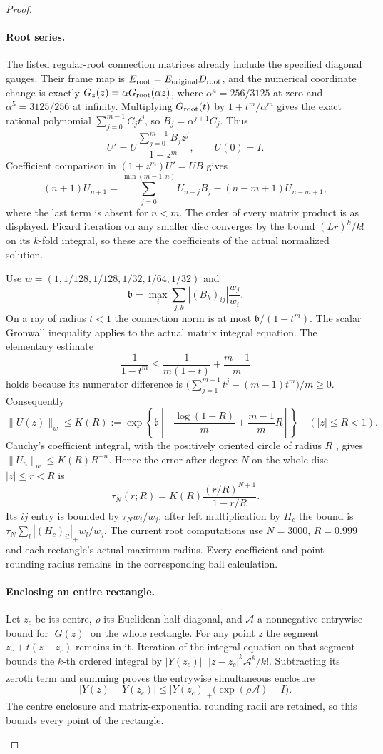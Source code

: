 \documentclass[11pt,a4paper]{article}
\theoremstyle{definition}
\begin{document}
\begin{proof}
\begin{enumerate}[label=\arabic*.]
\paragraph{Root series.}
The listed regular-root connection matrices already include the
specified diagonal gauges. Their frame map is
$E_{\rm root}=E_{\rm original}D_{\rm root}$, and the numerical
coordinate change is exactly
$G_z(z)=\alpha G_{\rm root}(\alpha z)$, where
$\alpha^4=256/3125$ at zero and $\alpha^5=3125/256$ at infinity.
Multiplying $G_{\rm root}(t)$ by $1+t^m/\alpha^m$ gives the exact
rational polynomial $\sum_{j=0}^{m-1}C_jt^j$, so
$B_j=\alpha^{j+1}C_j$. Thus
\[
 U'=U\frac{\sum_{j=0}^{m-1}B_jz^j}{1+z^m},\qquad U(0)=I.\tag{1.18.2}
\]
Coefficient comparison in $(1+z^m)U'=UB$ gives
\[
 (n+1)U_{n+1}
 =\sum_{j=0}^{\min(m-1,n)}U_{n-j}B_j
   -(n-m+1)U_{n-m+1},
\]
where the last term is absent for $n<m$. The order of every
matrix product is as displayed. Picard iteration on any smaller
disc converges by the bound $(Lr)^k/k!$ on its $k$-fold integral,
so these are the coefficients of the actual normalized solution.

Use $w=(1,1/128,1/128,1/32,1/64,1/32)$ and
\[
 \mathfrak b=\max_i\sum_{j,k}|(B_k)_{ij}|\frac{w_j}{w_i}.
\]
On a ray of radius $t<1$ the connection norm is at most
$\mathfrak b/(1-t^m)$. The scalar Gronwall inequality
\cite[Lemma~2.7, pp.~42--43]{TeschlODE2012} applies to the actual
matrix integral equation. The elementary estimate
\[
 \frac1{1-t^m}\le\frac1{m(1-t)}+\frac{m-1}{m}
\]
holds because its numerator difference is
$\bigl(\sum_{j=1}^{m-1}t^j-(m-1)t^m\bigr)/m\ge0$.
Consequently
\[
 \|U(z)\|_w\le K(R):=
 \exp\!\left\{\mathfrak b\left[-\frac{\log(1-R)}m
                 +\frac{m-1}{m}R\right]\right\}
 \quad (|z|\le R<1).
\]
Cauchy's coefficient integral, with the positively oriented circle
of radius $R$ \cite[\S1.9(iii), (1.9.30)--(1.9.31)]{DLMFCauchy2026},
gives $\|U_n\|_w\le K(R)R^{-n}$. Hence the error after degree $N$
on the whole disc $|z|\le r<R$ is
\[
 \tau_N(r;R)=K(R)\frac{(r/R)^{N+1}}{1-r/R}.\tag{1.18.3}
\]
Its $ij$ entry is bounded by $\tau_Nw_i/w_j$; after left
multiplication by $H_c$ the bound is
$\tau_N\sum_l|(H_c)_{il}|_+w_l/w_j$.
The current root computations use $N=3000$, $R=0.999$ and each
rectangle's actual maximum radius. Every coefficient and point
rounding radius remains in the corresponding ball calculation.

\paragraph{Enclosing an entire rectangle.}
Let $z_c$ be its centre, $\rho$ its Euclidean half-diagonal, and
$\mathcal A$ a nonnegative entrywise bound for $|G(z)|$ on the
whole rectangle. For any point $z$ the segment
$z_c+t(z-z_c)$ remains in it. Iteration of the integral equation
on that segment bounds the $k$-th ordered integral by
$|Y(z_c)|_+|z-z_c|^k\mathcal A^k/k!$. Subtracting its zeroth term
and summing proves the entrywise simultaneous enclosure
\[
 |Y(z)-Y(z_c)|
 \le |Y(z_c)|_+\bigl(\exp(\rho\mathcal A)-I\bigr).
\]
The centre enclosure and matrix-exponential rounding radii are
retained, so this bounds every point of the rectangle.


\end{enumerate}
\end{proof}
\end{document}
